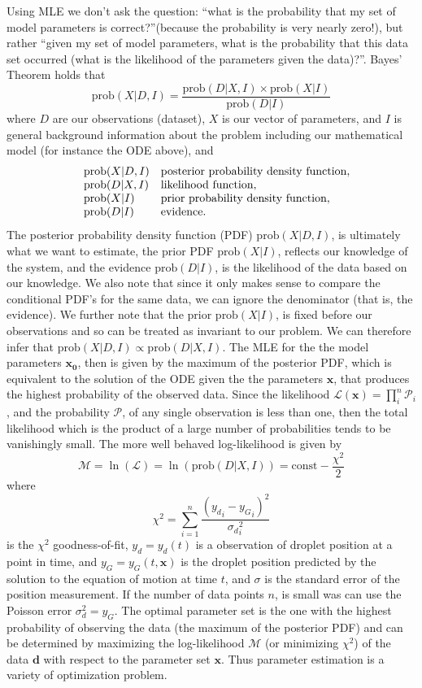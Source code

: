 \documentclass[12pt,a4paper,oneside]{book}
\begin{document}
Using MLE we don't ask the question: ``what is the probability that my set of model parameters is correct?''(because the probability is very nearly zero!), but rather ``given my set of model parameters, what is the probability that this data set occurred (what is the likelihood of the parameters given the data)?''. Bayes' Theorem holds that
\[\mbox{prob}(X|D, I) = \frac{\mbox{prob}(D|X,I) \times \mbox{prob}(X|I)}{\mbox{prob}(D|I)}\]
where $D$ are our observations (dataset), $X$ is our vector of parameters, and $I$ is general background information about the problem including our mathematical model (for instance the ODE above), and 
\[\begin{array}{lll}
& \centering \mbox{prob}(X|D, I) & \mbox{posterior probability density function},\\
& \centering \mbox{prob}(D|X, I) & \mbox{likelihood function},\\
& \centering \mbox{prob}(X|I) &  \mbox{prior probability density function},\\
& \centering \mbox{prob}(D|I) &  \mbox{evidence}.
\end{array}
\]
The posterior probability density function (PDF) $\mbox{prob}(X|D, I)$, is ultimately what we want to estimate, the prior PDF $\mbox{prob}(X|I)$, reflects our knowledge of the system, and the evidence $\mbox{prob}(D|I)$, is the likelihood of the data based on our knowledge. We also note that since it only makes sense to compare the conditional PDF's for the same data, we can ignore the denominator (that is, the evidence). We further note that the prior $\mbox{prob}(X|I)$, is fixed before our observations and so can be
treated as invariant to our problem. We can therefore infer that $\mbox{prob}(X|D, I) \propto \mbox{prob}(D|X, I)$. The MLE for the the model parameters $\mathbf{x_0}$, then is given by the maximum of the posterior PDF, which is equivalent to the solution of the ODE given the the parameters $\mathbf{x}$, that produces the highest probability of the observed data. Since the likelihood $\mathcal{L}(\mathbf{x}) = \prod_i^n \mathcal{P}_i$, and the probability $\mathcal{P}$, of any single observation is less than one, then the total likelihood which is the product of a large number of probabilities tends to be vanishingly small. The more well behaved log-likelihood is given by
\[\mathcal{M} = \ln(\mathcal{L}) = \ln(\mbox{prob}(D|X, I)) = \mbox{const} - \frac{\chi^2}{2}\]
where 
\[
\chi^2 = \sum^n_{i=1} \frac{\left({y_d}_i - {y_G}_i \right)^2}{{\sigma_d}_i^2}
\]
is the $\chi^2$ goodness-of-fit, $y_d = y_d(t)$ is a observation of droplet position at a point in time, and $y_G =  y_G(t, \mathbf{x})$ is the droplet position predicted by the solution to the equation of motion at time $t$, and $\sigma$ is the standard error of the position measurement. If the number of data points $n$, is small was can use the Poisson error $\sigma_d^2 = {y_G}$. The optimal parameter set is the one with the highest probability of observing the data (the maximum of the posterior PDF) and can be determined by maximizing the log-likelihood $\mathcal{M}$ (or minimizing $\chi^2$) of the data $\mathbf{d}$ with respect to the parameter set $\mathbf{x}$. Thus parameter estimation is a variety of optimization problem.
\end{document}
